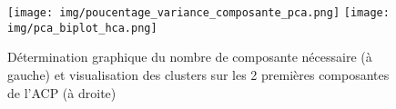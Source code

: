\begin{figure}[H]
    \centering
    \texttt{[image: img/poucentage\_variance\_composante\_pca.png]}
    \texttt{[image: img/pca\_biplot\_hca.png]}
    \caption{Détermination graphique du nombre de composante nécessaire (à gauche) et visualisation des clusters sur les 2 premières composantes de l'ACP (à droite)}
    \label{fig5}
\end{figure}